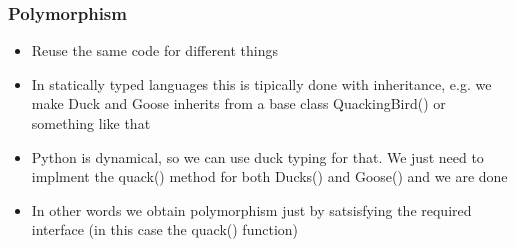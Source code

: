 \documentclass[9pt]{beamer}
\begin{document}
\begin{frame}
  \frametitle{Polymorphism}
  
  \begin{itemize}
    \item Reuse the same code for different things
    \medskip
    \item In statically typed languages this is tipically done with inheritance,
          e.g. we make Duck and Goose inherits from a base class QuackingBird()
          or something like that
    \medskip
    \item Python is dynamical, so we can use duck typing for that.
          We just need to implment the quack() method for both Ducks() and Goose() 
          and we are done
    \medskip
    \item In other words we obtain polymorphism just by satsisfying the required \alert{interface}
          (in this case the quack() function)
  \end{itemize}
  
\end{frame}
\end{document}
